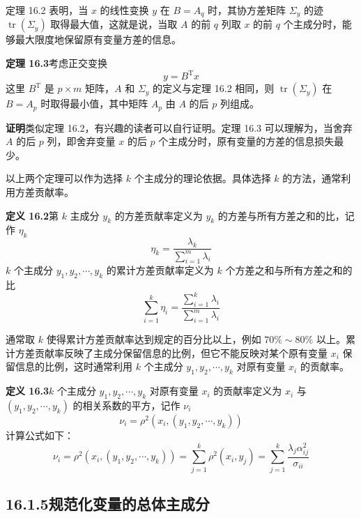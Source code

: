 \documentclass[UTF8, 12pt, fontset=fandol, oneside]{ctexart}
\begin{document}
定理 16.2 表明，当 $x$ 的线性变换 $y$ 在 $B=A_q$ 时，其协方差矩阵 $\Sigma_y$ 的迹 $\operatorname{tr}(\Sigma_y)$ 取得最大值，这就是说，当取 $A$ 的前 $q$ 列取 $x$ 的前 $q$ 个主成分时，能够最大限度地保留原有变量方差的信息。

\noindent\textbf{定理 16.3}\quad 考虑正交变换
\[
y=B^{\mathrm{T}}x
\]
这里 $B^{\mathrm{T}}$ 是 $p\times m$ 矩阵，$A$ 和 $\Sigma_y$ 的定义与定理 16.2 相同，则 $\operatorname{tr}(\Sigma_y)$ 在 $B=A_p$ 时取得最小值，其中矩阵 $A_p$ 由 $A$ 的后 $p$ 列组成。

\noindent\textbf{证明}\quad 类似定理 16.2，有兴趣的读者可以自行证明。定理 16.3 可以理解为，当舍弃 $A$ 的后 $p$ 列，即舍弃变量 $x$ 的后 $p$ 个主成分时，原有变量的方差的信息损失最少。

以上两个定理可以作为选择 $k$ 个主成分的理论依据。具体选择 $k$ 的方法，通常利用方差贡献率。

\noindent\textbf{定义 16.2}\quad 第 $k$ 主成分 $y_k$ 的方差贡献率定义为 $y_k$ 的方差与所有方差之和的比，记作 $\eta_k$
\begin{equation}
\eta_k=\frac{\lambda_k}{\displaystyle\sum_{i=1}^m\lambda_i}
\tag{16.30}
\end{equation}
$k$ 个主成分 $y_1,y_2,\cdots,y_k$ 的累计方差贡献率定义为 $k$ 个方差之和与所有方差之和的比
\begin{equation}
\sum_{i=1}^k\eta_i=
\frac{\displaystyle\sum_{i=1}^k\lambda_i}{\displaystyle\sum_{i=1}^m\lambda_i}
\tag{16.31}
\end{equation}

通常取 $k$ 使得累计方差贡献率达到规定的百分比以上，例如 $70\%\sim80\%$ 以上。累计方差贡献率反映了主成分保留信息的比例，但它不能反映对某个原有变量 $x_i$ 保留信息的比例，这时通常利用 $k$ 个主成分 $y_1,y_2,\cdots,y_k$ 对原有变量 $x_i$ 的贡献率。

\noindent\textbf{定义 16.3}\quad $k$ 个主成分 $y_1,y_2,\cdots,y_k$ 对原有变量 $x_i$ 的贡献率定义为 $x_i$ 与 $(y_1,y_2,\cdots,y_k)$ 的相关系数的平方，记作 $\nu_i$
\[
\nu_i=\rho^2(x_i,(y_1,y_2,\cdots,y_k))
\]
计算公式如下：
\begin{equation}
\nu_i=\rho^2(x_i,(y_1,y_2,\cdots,y_k))
=\sum_{j=1}^k\rho^2(x_i,y_j)
=\sum_{j=1}^k\frac{\lambda_j\alpha_{ij}^2}{\sigma_{ii}}
\tag{16.32}
\end{equation}

\subsection*{16.1.5\quad 规范化变量的总体主成分}
\end{document}
